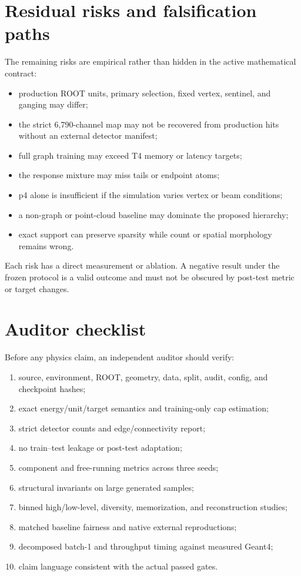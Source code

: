 \documentclass[10pt,a4paper]{article}
\begin{document}
\section{Residual risks and falsification paths}

The remaining risks are empirical rather than hidden in the active mathematical contract:
\begin{itemize}
\item production ROOT units, primary selection, fixed vertex, sentinel, and ganging may differ;
\item the strict 6,790-channel map may not be recovered from production hits without an external detector manifest;
\item full graph training may exceed T4 memory or latency targets;
\item the response mixture may miss tails or endpoint atoms;
\item p4 alone is insufficient if the simulation varies vertex or beam conditions;
\item a non-graph or point-cloud baseline may dominate the proposed hierarchy;
\item exact support can preserve sparsity while count or spatial morphology remains wrong.
\end{itemize}
Each risk has a direct measurement or ablation. A negative result under the frozen protocol is a valid outcome and must not be obscured by post-test metric or target changes.

\section{Auditor checklist}

Before any physics claim, an independent auditor should verify:
\begin{enumerate}
\item source, environment, ROOT, geometry, data, split, audit, config, and checkpoint hashes;
\item exact energy/unit/target semantics and training-only cap estimation;
\item strict detector counts and edge/connectivity report;
\item no train--test leakage or post-test adaptation;
\item component and free-running metrics across three seeds;
\item structural invariants on large generated samples;
\item binned high/low-level, diversity, memorization, and reconstruction studies;
\item matched baseline fairness and native external reproductions;
\item decomposed batch-1 and throughput timing against measured Geant4;
\item claim language consistent with the actual passed gates.
\end{enumerate}
\end{document}
